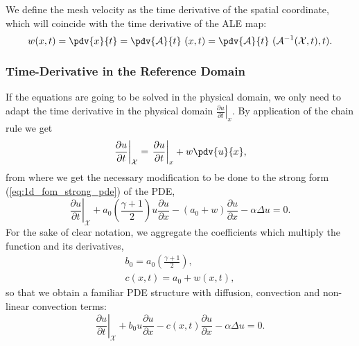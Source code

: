 \documentclass[../main.tex]{subfiles}
\newcommand{\alemap}{\ensuremath{\mathcal{A}}}
\newcommand{\aleX}{\ensuremath{\mathcal{X}}}
\begin{document}
We define the mesh velocity as the time derivative of the spatial coordinate, which will coincide with the time derivative of the ALE map:
\begin{equation}
    w(x,t) = \pdv{x}{t} = \pdv{\alemap}{t} \ (x, t) = \pdv{\alemap}{t} \ (\alemap^{-1} (\aleX,t), t).
\end{equation}

\subsubsection*{Time-Derivative in the Reference Domain}
If the equations are going to be solved in the physical domain, we only need to adapt the time derivative in the physical domain $\left.\frac{\partial u}{\partial t}\right|_{x}$.
By application of the chain rule we get
\begin{equation}
    \left.\frac{\partial u}{\partial t}\right|_{\aleX} = 
    \left.\frac{\partial u}{\partial t}\right|_{x} + w \pdv{u}{x},
\end{equation}
from where we get the necessary modification to be done to the strong form (\ref{eq:1d_fom_strong_pde}) of the PDE, 
\begin{equation}
    \left.\frac{\partial u}{\partial t}\right|_{\aleX} 
    + a_0 \left(\frac{\gamma+1}{2}\right) u \frac{\partial u}{\partial x} 
    - \left(a_0 + w\right)\frac{\partial u}{\partial x} 
    - \alpha \Delta u = 0.
\end{equation}
For the sake of clear notation, we aggregate the coefficients which multiply the function and its derivatives,
\begin{align}
    b_0 = a_0 \left(\frac{\gamma+1}{2}\right), \\
    c(x,t) = a_0 + w(x,t),
\end{align}
so that we obtain a familiar PDE structure with diffusion, convection and non-linear convection terms:
\begin{equation}
    \left.\frac{\partial u}{\partial t}\right|_{\aleX} 
    + b_0 u \frac{\partial u}{\partial x} 
    - c(x,t)\frac{\partial u}{\partial x} 
    - \alpha \Delta u = 0.
\end{equation}

\end{document}
